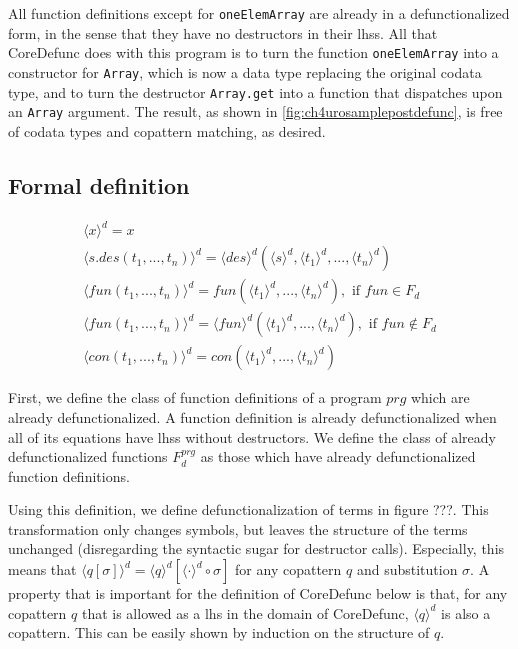 All function definitions except for \texttt{oneElemArray} are already in a defunctionalized form, in the sense that they have no destructors in their lhss. All that \textsf{CoreDefunc} does with this program is to turn the function \texttt{oneElemArray} into a constructor for \texttt{Array}, which is now a data type replacing the original codata type, and to turn the destructor \texttt{Array.get} into a function that dispatches upon an \texttt{Array} argument. The result, as shown in \autoref{fig:ch4urosamplepostdefunc}, is free of codata types and copattern matching, as desired.

\subsection{Formal definition}

\begin{figure}
\begin{align*}
\langle x \rangle^d = x \\
\langle s.des(t_1, ..., t_n) \rangle^d = \langle des \rangle^d (\langle s \rangle^d, \langle t_1 \rangle^d, ..., \langle t_n \rangle^d) \\
\langle fun(t_1, ..., t_n) \rangle^d = fun(\langle t_1 \rangle^d, ..., \langle t_n \rangle^d), \text{ if } fun \in F_d \\
\langle fun(t_1, ..., t_n) \rangle^d = \langle fun \rangle^d (\langle t_1 \rangle^d, ..., \langle t_n \rangle^d), \text{ if } fun \not\in F_d \\
\langle con(t_1, ..., t_n) \rangle^d = con(\langle t_1 \rangle^d, ..., \langle t_n \rangle^d)
\end{align*}
\end{figure}

First, we define the class of function definitions of a program $prg$ which are already defunctionalized. A function definition is already defunctionalized when all of its equations have lhss without destructors. We define the class of already defunctionalized functions $F^{prg}_d$ as those which have already defunctionalized function definitions.

Using this definition, we define defunctionalization of terms in figure ???. This transformation only changes symbols, but leaves the structure of the terms unchanged (disregarding the syntactic sugar for destructor calls). Especially, this means that $\langle q[\sigma] \rangle^d = \langle q \rangle^d [\langle \cdot \rangle^d \circ \sigma]$ for any copattern $q$ and substitution $\sigma$. A property that is important for the definition of \textsf{CoreDefunc} below is that, for any copattern $q$ that is allowed as a lhs in the domain of \textsf{CoreDefunc}, $\langle q \rangle^d$ is also a copattern. This can be easily shown by induction on the structure of $q$.

